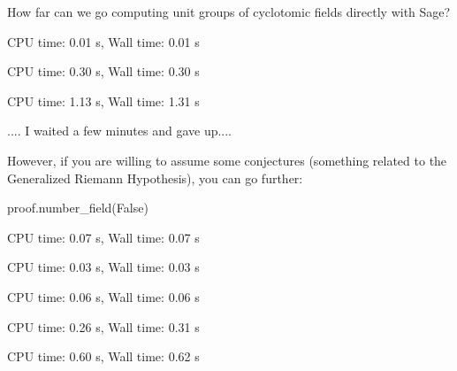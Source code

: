 How far can we go computing unit groups of cyclotomic fields directly with Sage?
\begin{sagecode} %
\begin{sagecell}
\end{sagecell}
\begin{sageout}
CPU time: 0.01 s, Wall time: 0.01 s
\end{sageout}
\begin{sagecell}
\end{sagecell}
\begin{sageout}
CPU time: 0.30 s, Wall time: 0.30 s
\end{sageout}
\begin{sagecell}
\end{sagecell}
\begin{sageout}
CPU time: 1.13 s, Wall time: 1.31 s
\end{sageout}
\begin{sagecell}
\end{sagecell}
\begin{sageout}
.... I waited a few minutes and gave up....
\end{sageout}
\end{sagecode}

However, if you are willing to assume some conjectures (something
related to the Generalized Riemann Hypothesis), you can go further:
\begin{sagecode} %
\begin{sagecell}
proof.number_field(False)
\end{sagecell}
\begin{sageout}
CPU time: 0.07 s, Wall time: 0.07 s
\end{sageout}
\begin{sagecell}
\end{sagecell}
\begin{sageout}
CPU time: 0.03 s, Wall time: 0.03 s
\end{sageout}
\begin{sagecell}
\end{sagecell}
\begin{sageout}
CPU time: 0.06 s, Wall time: 0.06 s
\end{sageout}
\begin{sagecell}
\end{sagecell}
\begin{sageout}
CPU time: 0.26 s, Wall time: 0.31 s
\end{sageout}
\begin{sagecell}
\end{sagecell}
\begin{sageout}
CPU time: 0.60 s, Wall time: 0.62 s
\end{sageout}
\end{sagecode}

